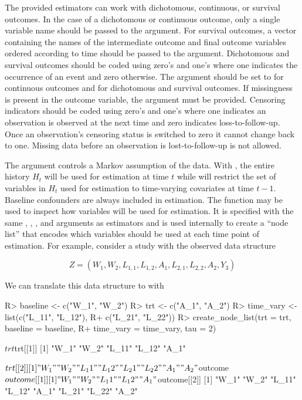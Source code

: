 \documentclass[]{jss}
\begin{document}
The provided estimators can work with dichotomous, continuous, or
survival outcomes. In the case of a dichotomous or continuous outcome,
only a single variable name should be passed to the 
argument. For survival outcomes, a vector containing the names of the
intermediate outcome and final outcome variables ordered according to
time should be passed to the  argument. Dichotomous and
survival outcomes should be coded using zero's and one's where one
indicates the occurrence of an event and zero otherwise. The
 argument should be set to  for
continuous outcomes and  for dichotomous and survival
outcomes. If missingness is present in the outcome variable, the
 argument must be provided. Censoring indicators should be
coded using zero's and one's where one indicates an observation is
observed at the next time and zero indicates loss-to-follow-up. Once an
observation's censoring status is switched to zero it cannot change back
to one. Missing data before an observation is lost-to-follow-up is not
allowed.

The  argument controls a Markov assumption of the data. With
, the entire history \(H_t\) will be used for estimation
at time \(t\) while  will restrict the set of variables in
\(H_t\) used for estimation to time-varying covariates at time \(t - 1\). 
Baseline confounders are always included in estimation. The 
 function may be used to inspect how variables
will be used for estimation. It is specified with the same ,
, , and  arguments as 
estimators and is used internally to create a ``node list'' that encodes
which variables should be used at each time point of estimation. For
example, consider a study with the observed data structure

\begin{equation}
Z = (W_1, W_2, L_{1, 1}, L_{1, 2}, A_1, L_{2, 1}, L_{2, 2}, A_2, Y_3)
\end{equation}

We can translate this data structure to  with

\begin{CodeChunk}

\begin{CodeInput}
R> baseline <- c("W_1", "W_2")
R> trt <- c("A_1", "A_2")
R> time_vary <- list(c("L_11", "L_12"), 
R+                   c("L_21", "L_22"))
R> create_node_list(trt = trt, baseline = baseline, 
R+                  time_vary = time_vary, tau = 2)
\end{CodeInput}

\begin{CodeOutput}
$trt
$trt[[1]]
[1] "W_1"  "W_2"  "L_11" "L_12" "A_1" 

$trt[[2]]
[1] "W_1"  "W_2"  "L_11" "L_12" "L_21" "L_22" "A_1"  "A_2" 


$outcome
$outcome[[1]]
[1] "W_1"  "W_2"  "L_11" "L_12" "A_1" 

$outcome[[2]]
[1] "W_1"  "W_2"  "L_11" "L_12" "A_1"  "L_21" "L_22" "A_2" 
\end{CodeOutput}
\end{CodeChunk}
\end{document}
